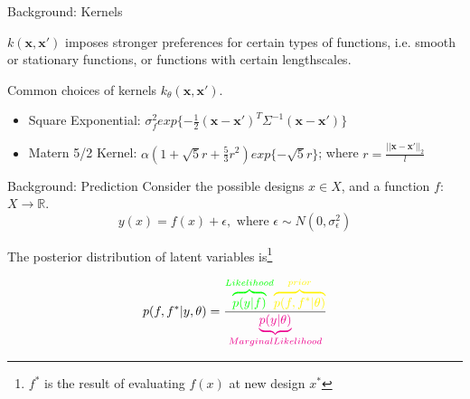 \documentclass{beamer}
\begin{document}
\begin{frame}{Background: Kernels}

$k(\mathbf{x},\mathbf{x}')$ imposes stronger preferences for certain types of functions, i.e. smooth or stationary functions, or functions with certain lengthscales.
\vspace{3mm}

Common choices of kernels $k_{\theta}(\mathbf{x},\mathbf{x}') $.\\
\begin{itemize}
	\item Square Exponential: $\sigma^{2}_{f}exp\{-\frac{1}{2}(\mathbf{x}-\mathbf{x'})^{T}\Sigma^{-1}(\mathbf{x}-\mathbf{x'})\}$
	\item Matern 5/2 Kernel: $\alpha(1+\sqrt{5}r+\frac{5}{3}r^{2})exp\{-\sqrt{5}r\}$; where $r=\frac{||\mathbf{x} - \mathbf{x'}||_{2}}{l}$
\end{itemize}
\end{frame}

\begin{frame}{Background: Prediction}
Consider the possible designs $x \in X$, and a function $f$: $X \rightarrow \mathbb{R}$.\\
$$y(x) = f(x) +\epsilon,\text{ where }\epsilon \sim N(0,\sigma^{2}_{\epsilon})$$

The posterior distribution of latent variables is\footnote{$f^{*}$ is the result of evaluating $f(x)$ at new design $x^{*}$}

$$ p(f,f^{*}|y,\theta) = \frac{ \textcolor{green}{\overbrace{p(y|f)}^{Likelihood}}\textcolor{yellow}{\overbrace{p(f,f^{*}|\theta)}^{prior}}}{ \textcolor{magenta}{\underbrace{p(y|\theta)}_{Marginal Likelihood}}} $$

\end{frame}
\end{document}

